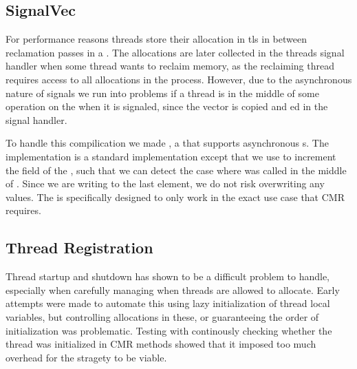 \subsection{SignalVec\label{sec:impl-signalvec}}

For performance reasons threads store their allocation in \gls{tls} in between reclamation passes
in a .  The allocations are later collected in the threads signal handler when some
thread wants to reclaim memory, as the reclaiming thread requires access to all allocations in the
process. However, due to the asynchronous nature of signals we run into problems if a thread is in
the middle of some operation on the  when it is signaled, since the vector is copied and
ed in the signal handler.

To handle this compilication we made , a  that supports asynchronous
s. The implementation is a standard  implementation except that we use
 to increment the  field of the , such that we can detect
the case where  was called in the middle of . Since we are writing to the
last element, we do not risk overwriting any values. The  is specifically designed
to only work in the exact use case that CMR requires.


\subsection{Thread Registration\label{sec:impl-thread-registration}}

Thread startup and shutdown has shown to be a difficult problem to handle, especially when
carefully managing when threads are allowed to allocate. Early attempts were made to automate this
using lazy initialization of thread local variables, but controlling allocations in these, or
guaranteeing the order of initialization was problematic. Testing with continously checking whether
the thread was initialized in CMR methods showed that it imposed too much overhead for the stragety
to be viable.









